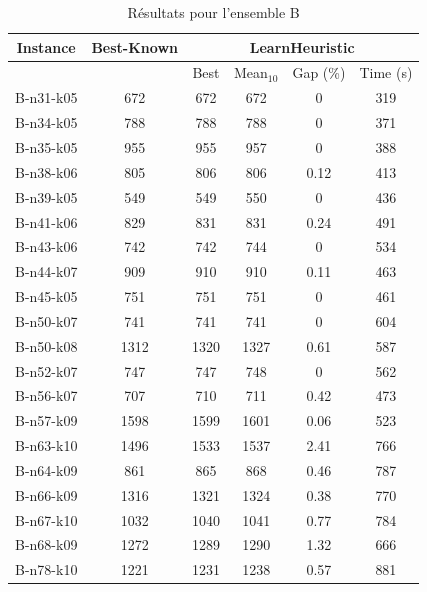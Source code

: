 \documentclass[a4paper,11pt]{article}%
\begin{document}
\begin{table}[p]
\caption{Résultats pour l'ensemble B}
\label{TB}
\begin{center}
\begin{tabular}{|@{}c@{}|@{}c@{}|@{}c@{}|@{}c@{}|@{}c@{}|@{}c@{}|}

\hline
 Instance & Best-Known & \multicolumn{4}{c|}{LearnHeuristic}  \\
 \hline
 & & Best & Mean$_{10}$ & Gap (\%) & Time (s) \\ 
 \hline
 B-n31-k05 & 672 & 672 & 672 & 0 & 319 \\
 \hline
 B-n34-k05   & 788 & 788 & 788 &0 & 371  \\
  \hline
   B-n35-k05 & 955 & 955 & 957 &0 & 388  \\
 \hline
   B-n38-k06 & 805 & 806 & 806 &0.12 & 413  \\
  \hline
   B-n39-k05 & 549 & 549 & 550 & 0 & 436  \\
 \hline
  B-n41-k06  & 829 & 831 & 831 & 0.24 & 491  \\
  \hline
  B-n43-k06 & 742 & 742 & 744 & 0 & 534 \\
 \hline
  B-n44-k07  & 909 & 910 & 910 & 0.11 & 463 \\
 \hline
 B-n45-k05 & 751 & 751 & 751 & 0 & 461 \\
 \hline
   B-n50-k07 & 741 & 741 & 741 & 0 & 604   \\
  \hline
   B-n50-k08 & 1312 & 1320 & 1327 & 0.61 & 587  \\
  \hline
  B-n52-k07  & 747 & 747 & 748 &0 & 562  \\
  \hline
  B-n56-k07 & 707 & 710 & 711 & 0.42 & 473  \\
 \hline
  B-n57-k09  & 1598 & 1599 & 1601 &0.06 & 523 \\
  \hline
  B-n63-k10  & 1496 & 1533 & 1537 & 2.41 & 766   \\
  \hline
  B-n64-k09 & 861 & 865 & 868 & 0.46 & 787 \\
 \hline 
   B-n66-k09 & 1316 & 1321 & 1324 &0.38 & 770   \\
  \hline 
  B-n67-k10  & 1032 & 1040 & 1041 & 0.77 & 784 \\
  \hline
    B-n68-k09  & 1272 & 1289 & 1290 &1.32 & 666  \\
  \hline
    B-n78-k10  & 1221 & 1231 & 1238 & 0.57 & 881 \\
  \hline
\end{tabular}
\end{center}
\end{table}
\end{document}
